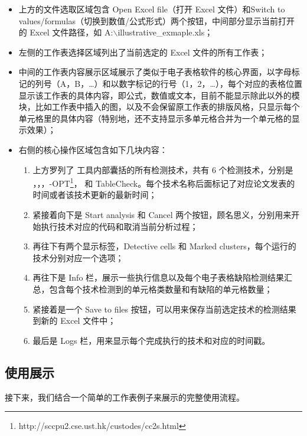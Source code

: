 \begin{itemize}
    \item 上方的文件选取区域包含 Open Excel file（打开 Excel 文件）和Switch to values/formulas（切换到数值/公式形式）两个按钮，中间部分显示当前打开的 Excel 文件路径，如 A:$\backslash$illustrative\_exmaple.xls；
    \item 左侧的工作表选择区域列出了当前选定的 Excel 文件的所有工作表；
    \item 中间的工作表内容展示区域展示了类似于电子表格软件的核心界面，以字母标记的列号（A，B，\dots）和以数字标记的行号（1，2，\dots），每个对应的表格位置显示该工作表的具体内容，即公式，数值或文本，目前不能显示除此以外的模块，比如工作表中插入的图，以及不会保留原工作表的排版风格，只显示每个单元格里的具体内容（特别地，还不支持显示多单元格合并为一个单元格的显示效果）；
    \item 右侧的核心操作区域包含如下几块内容：
        \begin{enumerate}
            \item 上方罗列了 \sg 工具内部囊括的所有检测技术，共有 6 个检测技术，分别是 \am\cite{dou2014spreadsheet}，\ca\cite{dou2017cacheck}，\cu\cite{cheung2016custodes}，\cu-OPT\footnote{http://sccpu2.cse.ust.hk/custodes/cc2s.html}，\wa\cite{li2019sguard} 和 TableCheck\cite{dou2016detecting}。每个技术名称后面标记了对应论文发表的时间或者该技术更新的最新时间；
            \item 紧接着向下是 Start analysis 和 Cancel 两个按钮，顾名思义，分别用来开始执行技术对应的代码和取消当前分析过程；
            \item 再往下有两个显示标签，Detective cells 和 Marked clusters，每个运行的技术分别对应一个选项；
            \item 再往下是 Info 栏，展示一些执行信息以及每个电子表格缺陷检测结果汇总，包含每个技术检测到的单元格类数量和有缺陷的单元格数量；
            \item 紧接着是一个 Save to files 按钮，可以用来保存当前选定技术的检测结果到新的 Excel 文件中；
            \item 最后是 Logs 栏，用来显示每个完成执行的技术和对应的时间戳。
        \end{enumerate}
\end{itemize}

\subsection{使用展示}

接下来，我们结合一个简单的工作表例子来展示\sg 的完整使用流程。

